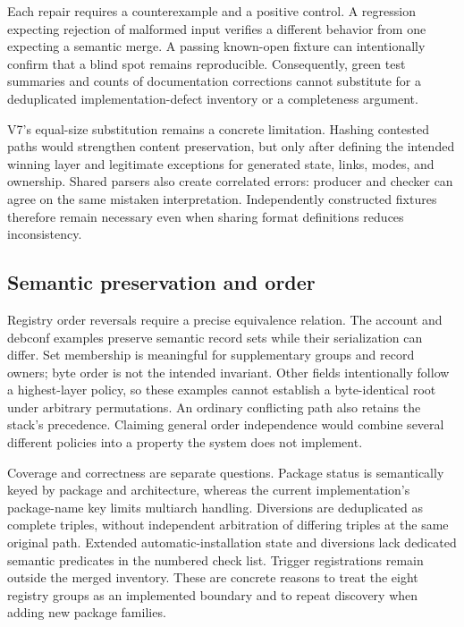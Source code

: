 Each repair requires a counterexample and a positive control. A regression expecting rejection of malformed input verifies a different behavior from one expecting a semantic merge. A passing known-open fixture can intentionally confirm that a blind spot remains reproducible. Consequently, green test summaries and counts of documentation corrections cannot substitute for a deduplicated implementation-defect inventory or a completeness argument.

V7's equal-size substitution remains a concrete limitation. Hashing contested paths would strengthen content preservation, but only after defining the intended winning layer and legitimate exceptions for generated state, links, modes, and ownership. Shared parsers also create correlated errors: producer and checker can agree on the same mistaken interpretation. Independently constructed fixtures therefore remain necessary even when sharing format definitions reduces inconsistency.

\subsection{Semantic preservation and order}

Registry order reversals require a precise equivalence relation. The account and debconf examples preserve semantic record sets while their serialization can differ. Set membership is meaningful for supplementary groups and record owners; byte order is not the intended invariant. Other fields intentionally follow a highest-layer policy, so these examples cannot establish a byte-identical root under arbitrary permutations. An ordinary conflicting path also retains the stack's precedence. Claiming general order independence would combine several different policies into a property the system does not implement.

Coverage and correctness are separate questions. Package status is semantically keyed by package and architecture, whereas the current implementation's package-name key limits multiarch handling. Diversions are deduplicated as complete triples, without independent arbitration of differing triples at the same original path. Extended automatic-installation state and diversions lack dedicated semantic predicates in the numbered check list. Trigger registrations remain outside the merged inventory. These are concrete reasons to treat the eight registry groups as an implemented boundary and to repeat discovery when adding new package families.

